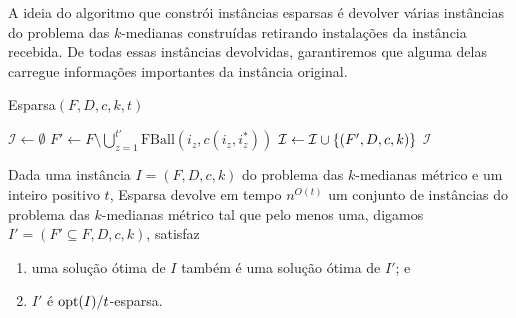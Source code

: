 A ideia do algoritmo que constrói instâncias esparsas é devolver várias instâncias do problema das $k$-medianas construídas retirando instalações da instância recebida. De todas essas instâncias devolvidas, garantiremos que alguma delas carregue informações importantes da instância original.

\begin{algorithm}
    \caption{\sc Esparsa$(F,D,c,k,t)$}
    \begin{algorithmic}[1]
        \State $\mathcal{I} \gets \emptyset$
        \State $F' \gets F\setminus \bigcup_{z=1}^{t'} \text{FBall}(i_z,c(i_z,i_z^*))$
        \State $\mathcal{I} \gets \mathcal{I} \cup \{(F',D,c,k)\}$
        \EndFor
        \State \Return $\mathcal{I}$
    \end{algorithmic}
\end{algorithm}

\begin{lemma}
    Dada uma instância $I = (F,D,c,k)$ do problema das $k$-medianas métrico e um inteiro positivo $t$, {\sc Esparsa} devolve em tempo $n^{O(t)}$ um conjunto de instâncias do problema das $k$-medianas métrico tal que pelo menos uma, digamos ${I' = (F' \subseteq F,D,c,k)}$, satisfaz
    \begin{enumerate}
        \item uma solução ótima de $I$ também é uma solução ótima de $I'$; e
        \item $I'$ é $\mathrm{opt}(I)/t$-esparsa.
    \end{enumerate}
\end{lemma}

